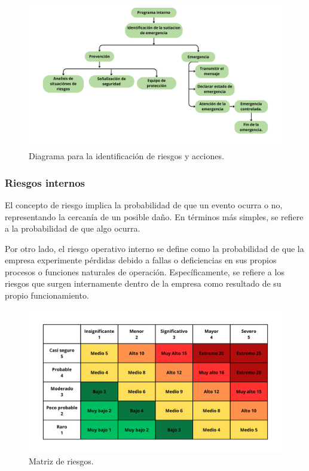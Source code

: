 \begin{figure}[H]
    \centering
    \includegraphics[scale=0.181]{15/img/diagramaIdentifiacionRiesgosAcciones.pdf}
    \caption{Diagrama para la identificación de riesgos y acciones.}
    \label{fig:diagramaIdentificacionRiesgosAcciones}
\end{figure}

\subsubsection{Riesgos internos}

El concepto de riesgo implica la probabilidad de que un evento ocurra o no, representando la cercanía de un posible daño. En términos más simples, se refiere a la probabilidad de que algo ocurra. 

Por otro lado, el riesgo operativo interno se define como la probabilidad de que la empresa experimente pérdidas debido a fallas o deficiencias en sus propios procesos o funciones naturales de operación. Específicamente, se refiere a los riesgos que surgen internamente dentro de la empresa como resultado de su propio funcionamiento.

\begin{figure}[H]
    \centering
    \includegraphics[scale=0.181]{15/img/nivelesDeRiesgos.pdf}
    \caption{Matriz de riesgos.}
    \label{fig:nivelesDeRiesgos}
\end{figure}

